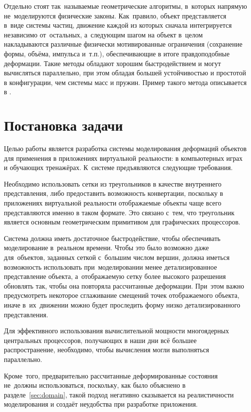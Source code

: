 \documentclass[a4paper, 14pt, titlepage]{extarticle}
\begin{document}
    Отдельно стоят так~называемые геометрические алгоритмы, в~которых напрямую не~моделируются
    физические законы. Как~правило, объект представляется в~виде системы частиц, движение каждой из
    которых сначала интегрируется независимо от~остальных, а~следующим шагом на объект в~целом
    накладываются различные физически мотивированные ограничения (сохранение формы, объёма, импульса
    и~т.п.), обеспечивающие в итоге правдоподобные деформации. Такие методы обладают хорошим
    быстродействием и могут вычисляться параллельно, при этом обладая большей устойчивостью и
    простотой в конфигурации, чем системы масс и пружин. Пример такого метода описывается в \cite{mueller-meshless}.

  \section{Постановка задачи}

    Целью работы является разработка системы моделирования деформаций объектов для применения в
    приложениях виртуальной реальности: в компьютерных играх и обучающих тренажёрах.
    К~системе предъявляются следующие требования.

    Необходимо использовать сетки из треугольников в качестве внутреннего представления, либо
    предоставить возможность конвертации, поскольку в приложениях виртуальной реальности отображаемые объекты
    чаще всего представляются именно в таком формате. Это связано с~тем, что треугольник является
    основным геометрическим примитивом для графических процессоров. %

    Система должна иметь достаточное быстродействие, чтобы обеспечивать моделирование в~реальном
    времени. Чтобы это было возможно даже для~объектов, заданных сеткой с~большим числом вершин,
    должна иметься возможность использовать при~моделировании менее детализированное представление
    объекта, а~отображаемую сетку более высокого разрешения обновлять так, чтобы она повторяла
    рассчитанные деформации. При~этом важно предусмотреть некоторое сглаживание смещений точек
    отображаемого объекта, иначе в~их~движении можно будет проследить форму низко детализированного
    представления.

    Для эффективного использования вычислительной мощности многоядерных центральных процессоров,
    получающих в наши дни всё большее распространение, необходимо, чтобы вычисления могли
    выполняться параллельно.

    Кроме~того, предварительно рассчитанные деформированные состояния не~должны использоваться,
    поскольку, как было объяснено в разделе~\ref{sec:domain}, такой подход негативно сказывается на реалистичности
    моделирования и создаёт неудобства при разработке приложения.
\end{document}
